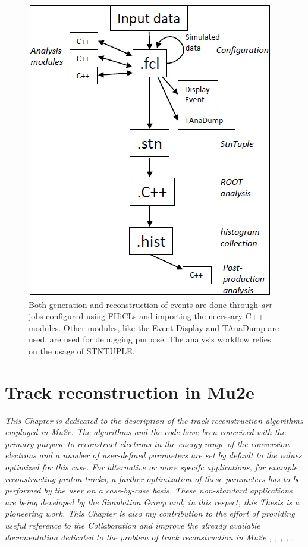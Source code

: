 \documentclass[12pt,a4paper,openright, oneside, titlepage]{book} %
\begin{document}
\begin{figure}[h!]
\centering
\includegraphics[scale=0.8]{mu2e_datahandling}
\caption[Mu2e data handling]{Both generation and reconstruction of events are done through \textit{art}-jobs configured using FHiCLs and importing the necessary C++ modules. 
Other modules, like the Event Display and TAnaDump are used, are used for debugging purpose.
The analysis workflow relies on the usage of STNTUPLE.}
\label{_mu2e_datahandling}
\end{figure}



\chapter{Track reconstruction in Mu2e}
{\itshape This Chapter is dedicated to the description of the track reconstruction algorithms employed in Mu2e. 
The algorithms and the  code have been conceived with the primary purpose 
to reconstruct electrons in the energy range of the conversion electrons 
and a number of user-defined parameters are set by default to the values optimized for this  case.
For alternative or more specifc applications, for example reconstructing proton tracks, 
a further optimization of these parameters has to be performed by the user
on a case-by-case basis.
These non-standard applications are being developed by the 
Simulation Group and, in this respect, this Thesis is a pioneering work.
This Chapter is also my contribution to the effort of providing 
useful reference to the Collaboration and improve the
already available documentation dedicated to the problem of track reconstruction in Mu2e \cite{GianiPatRec:2016}, \cite{GianiPatRec:2020}, \cite{Brown:2014}, \cite{Kalman},  \cite{KutschkePaper}.}
\end{document}
